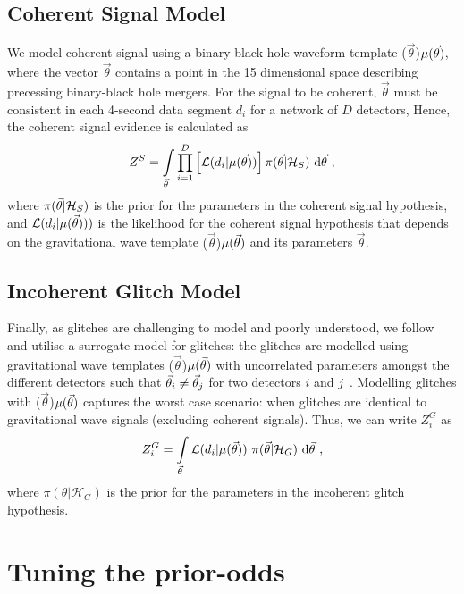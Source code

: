 \documentclass[%
 nofootinbib,
 amsmath,amssymb,
 aps,
 twocolumn
]{revtex4-2}
\newcommand{\mathcmd}[1]{{\sc \relax\ifmmode#1\else $#1$\fi}\xspace}
\newcommand{\parameters}{\mathcmd{\vec{\theta}}}
\newcommand{\template}{\mathcmd{\mu(\parameters)}}
\begin{document}
\subsection{Coherent Signal Model}
We model coherent signal using a binary black hole waveform template \template, where the vector \parameters contains a point in the 15 dimensional space describing precessing binary-black hole mergers. For the signal to be coherent, \parameters must be consistent in each 4-second data segment $d_i$ for a network of $D$ detectors, Hence, the coherent signal evidence is calculated as
\begin{equation}
\label{eq:zs}
Z^S = \int\limits_{\parameters} \prod\limits^{D}_{i=1} \left[ \mathcal{L}(d_i|\template)\right] \pi(\parameters | \mathcal{H}_S)\  \text{d}\parameters \ ,
\end{equation}
where $\pi(\parameters| \mathcal{H}_S)$ is the prior for the parameters in the coherent signal hypothesis, and $\mathcal{L}(d_i|\template))$ is the likelihood for the coherent signal hypothesis that depends on the gravitational wave template \template and its parameters \parameters. 

\subsection{Incoherent Glitch Model}
Finally, as glitches are challenging to model and poorly understood, we follow \citet{bci} and utilise a surrogate model for glitches: the glitches are modelled using gravitational wave templates  \template with uncorrelated  parameters amongst the different detectors such that  $\parameters_i \neq \parameters_j$ for two detectors $i$ and $j$~\cite{bci}.  Modelling glitches with \template captures the worst case scenario: when glitches are identical to gravitational wave signals (excluding coherent signals). Thus, we can write $Z^G_i$ as 
\begin{equation}
\label{eq:zg}
Z^G_i = \int\limits_{\parameters} \mathcal{L}(d_i|\template)\ \pi(\parameters| \mathcal{H}_G)\  \text{d}\parameters  \ ,
\end{equation}
where $\pi(\theta| \mathcal{H}_G)$ is the prior for the parameters in the incoherent glitch hypothesis. 



\section{Tuning the prior-odds}\label{sec:tuning-prior-odds}
\end{document}
